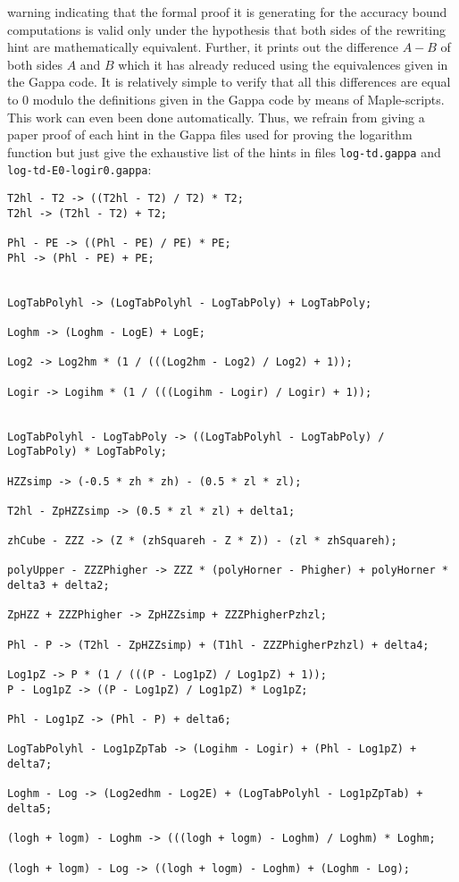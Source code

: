 warning indicating that the formal proof it is generating for the accuracy bound computations is valid only under
the hypothesis that both sides of the rewriting hint are mathematically equivalent. Further, it prints out the 
difference $A - B$ of both sides $A$ and $B$ which it has already reduced using the equivalences given in the 
Gappa code. It is relatively simple to verify that all this differences are equal to $0$ modulo the definitions 
given in the Gappa code by means of Maple-scripts. This work can even been done automatically. Thus, we refrain 
from giving a paper proof of each hint in the Gappa files used for proving the logarithm function but just 
give the exhaustive list of the hints in files {\tt log-td.gappa} and {\tt log-td-E0-logir0.gappa}:
\begin{lstlisting}[caption={Gappa term rewriting hints in file {\tt log-td.gappa}},firstnumber=115]
T2hl - T2 -> ((T2hl - T2) / T2) * T2;
T2hl -> (T2hl - T2) + T2;

Phl - PE -> ((Phl - PE) / PE) * PE;
Phl -> (Phl - PE) + PE;


LogTabPolyhl -> (LogTabPolyhl - LogTabPoly) + LogTabPoly;

Loghm -> (Loghm - LogE) + LogE;

Log2 -> Log2hm * (1 / (((Log2hm - Log2) / Log2) + 1));

Logir -> Logihm * (1 / (((Logihm - Logir) / Logir) + 1));


LogTabPolyhl - LogTabPoly -> ((LogTabPolyhl - LogTabPoly) / LogTabPoly) * LogTabPoly;

HZZsimp -> (-0.5 * zh * zh) - (0.5 * zl * zl);

T2hl - ZpHZZsimp -> (0.5 * zl * zl) + delta1;

zhCube - ZZZ -> (Z * (zhSquareh - Z * Z)) - (zl * zhSquareh);

polyUpper - ZZZPhigher -> ZZZ * (polyHorner - Phigher) + polyHorner * delta3 + delta2;

ZpHZZ + ZZZPhigher -> ZpHZZsimp + ZZZPhigherPzhzl;

Phl - P -> (T2hl - ZpHZZsimp) + (T1hl - ZZZPhigherPzhzl) + delta4;

Log1pZ -> P * (1 / (((P - Log1pZ) / Log1pZ) + 1));
P - Log1pZ -> ((P - Log1pZ) / Log1pZ) * Log1pZ;

Phl - Log1pZ -> (Phl - P) + delta6;

LogTabPolyhl - Log1pZpTab -> (Logihm - Logir) + (Phl - Log1pZ) + delta7;

Loghm - Log -> (Log2edhm - Log2E) + (LogTabPolyhl - Log1pZpTab) + delta5;

(logh + logm) - Loghm -> (((logh + logm) - Loghm) / Loghm) * Loghm;

(logh + logm) - Log -> ((logh + logm) - Loghm) + (Loghm - Log);
\end{lstlisting}
